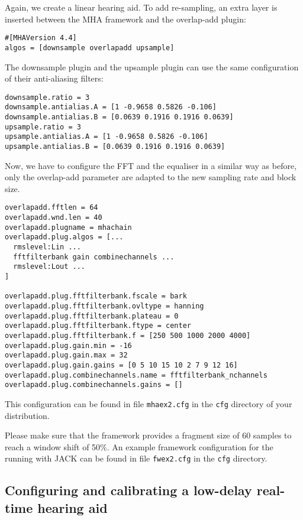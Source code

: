 Again, we create a linear hearing aid. To add re-sampling, an extra
layer is inserted between the MHA framework and the overlap-add
plugin:
\begin{verbatim}
#[MHAVersion 4.4]
algos = [downsample overlapadd upsample]
\end{verbatim}
The downsample plugin and the upsample plugin can use the same
configuration of their anti-aliasing filters:
\begin{verbatim}
downsample.ratio = 3
downsample.antialias.A = [1 -0.9658 0.5826 -0.106]
downsample.antialias.B = [0.0639 0.1916 0.1916 0.0639]
upsample.ratio = 3
upsample.antialias.A = [1 -0.9658 0.5826 -0.106]
upsample.antialias.B = [0.0639 0.1916 0.1916 0.0639]
\end{verbatim}
Now, we have to configure the FFT and the equaliser in a similar way
as before, only the overlap-add parameter are adapted to the new
sampling rate and block size.
\begin{verbatim}
overlapadd.fftlen = 64
overlapadd.wnd.len = 40
overlapadd.plugname = mhachain
overlapadd.plug.algos = [...
  rmslevel:Lin ...
  fftfilterbank gain combinechannels ...
  rmslevel:Lout ...
]

overlapadd.plug.fftfilterbank.fscale = bark
overlapadd.plug.fftfilterbank.ovltype = hanning
overlapadd.plug.fftfilterbank.plateau = 0
overlapadd.plug.fftfilterbank.ftype = center
overlapadd.plug.fftfilterbank.f = [250 500 1000 2000 4000]
overlapadd.plug.gain.min = -16
overlapadd.plug.gain.max = 32
overlapadd.plug.gain.gains = [0 5 10 15 10 2 7 9 12 16]
overlapadd.plug.combinechannels.name = fftfilterbank_nchannels
overlapadd.plug.combinechannels.gains = []
\end{verbatim}
This configuration can be found in file \verb!mhaex2.cfg! in the
\verb!cfg! directory of your distribution.

Please make sure that the framework provides a fragment size of 60
samples to reach a window shift of 50\%. An example framework
configuration for the \mhad{} running with JACK can be found in file
\verb!fwex2.cfg! in the \verb!cfg! directory.

\subsection{Configuring and calibrating a low-delay real-time hearing aid}

